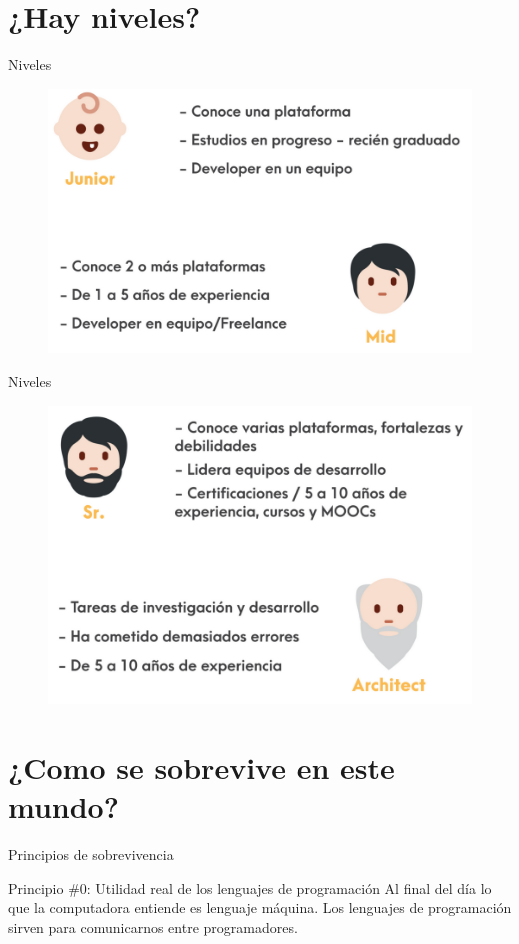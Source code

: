\documentclass[aspectratio=169]{beamer}
\begin{document}
\section{¿Hay niveles?}

\begin{frame}[fragile,c]{Niveles}

 \begin{figure}
        \centering
        \includegraphics[width=0.7\linewidth]{Images/niveles1}
    \end{figure}
\end{frame}

\begin{frame}[fragile,c]{Niveles}

 \begin{figure}
        \centering
        \includegraphics[width=0.7\linewidth]{Images/niveles2}
    \end{figure}
\end{frame}

\section{¿Como se sobrevive en este mundo?}

\begin{frame}{Principios de sobrevivencia}

	\begin{exampleblock}{Principio \#0: Utilidad real de los lenguajes de programación}
    Al final del día lo que la computadora entiende es lenguaje máquina. Los lenguajes de programación sirven para comunicarnos entre programadores.
	\end{exampleblock}
\end{frame}
\end{document}
